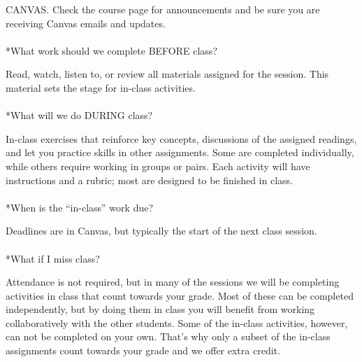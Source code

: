 \documentclass[
  10pt,
  letterpaper,
  oneside,
  open=any]{scrbook}
\makeatletter
\let\oldparagraph\paragraph
\renewcommand{\paragraph}{
    \@ifstar
      \xxxParagraphStar
      \xxxParagraphNoStar
  }
\newcommand{\xxxParagraphStar}[1]{\oldparagraph*{#1}\mbox{}}
\newcommand{\xxxParagraphNoStar}[1]{\oldparagraph{#1}\mbox{}}
\makeatother
\begin{document}
CANVAS. Check the course page for announcements and be sure you are
receiving Canvas emails and updates.

\paragraph*{What work should we complete BEFORE
class?}\label{what-work-should-we-complete-before-class}

Read, watch, listen to, or review all materials assigned for the
session. This material sets the stage for in-class activities.

\paragraph*{What will we do DURING
class?}\label{what-will-we-do-during-class}

In-class exercises that reinforce key concepts, discussions of the
assigned readings, and let you practice skills in other assignments.
Some are completed individually, while others require working in groups
or pairs. Each activity will have instructions and a rubric; most are
designed to be finished in class.

\paragraph*{When is the ``in-class'' work
due?}\label{when-is-the-in-class-work-due}

Deadlines are in Canvas, but typically the start of the next class
session.

\paragraph*{What if I miss class?}\label{what-if-i-miss-class}

Attendance is not required, but in many of the sessions we will be
completing activities in class that count towards your grade. Most of
these can be completed independently, but by doing them in class you
will benefit from working collaboratively with the other students. Some
of the in-class activities, however, can not be completed on your own.
That's why only a subset of the in-class assignments count towards your
grade and we offer extra credit.
\end{document}
